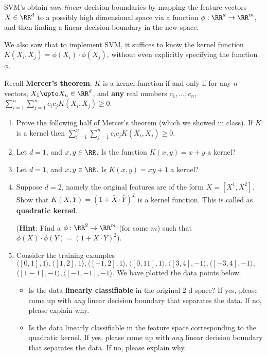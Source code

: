 \documentclass[11pt]{article}
\newenvironment{problem}[2][Problem]{\begin{trivlist}
\item[\hskip \labelsep {\bfseries #1}\hskip \labelsep {\bfseries #2.}]}{\end{trivlist}}
\begin{document}
\begin{problem}{1. (15 points)}
SVM's obtain \emph{non-linear} decision boundaries by mapping the feature vectors $ X\in \RR^d$ to a possibly high dimensional space via a function $\phi:\RR^d\to\RR^m$, and then finding a linear decision boundary in the new space. 

We also saw that to implement SVM, it suffices to know the kernel function $K( X_i,  X_j)=\phi( X_i)\cdot \phi( X_j)$, without even explicitly specifying the function $\phi$. 

Recall \textbf{Mercer's theorem}. $K$ is a kernel function if and only if for any $n$ vectors, $ X_1\upto  X_n\in \RR^d$, and \textbf{any} real numbers $c_1, \ldots, c_n$, $\sum_{i=1}^n\sum_{j=1}^n c_i c_j K( X_i,  X_j)\ge0$. 

\begin{enumerate}
\item 
Prove the following half of Mercer's theorem (which we showed in class). If $K$ is a kernel then $\sum_{i=1}^n\sum_{j=1}^n c_i c_j K( X_i, X_j)\ge0$. 
\item
Let $d=1$, and $x,y\in \RR$. Is the function $K(x,y)=x+y$ a kernel? 
\item 
Let $d=1$, and $x,y\in\RR$. Is $K(x,y)=xy+1$ a kernel?
\item
Suppose $d=2$, namely the original features are of the form $ X = [ X^1,  X^2]$. Show that $K( X, Y)=(1+\bar X\cdot \bar Y)^2$ is a kernel function. This is called as \textbf{quadratic kernel}.
 
(\textbf{Hint}: Find a $\phi:\RR^2\to \RR^m$ (for some $m$) such that $\phi( X)\cdot \phi( Y) = (1+ X\cdot Y)^2$). 
\item
Consider the training examples $\langle[0, 1], 1\rangle, \langle[1, 2], 1\rangle,\langle[-1, 2], 1\rangle,\langle[0, 11], 1\rangle, \langle[3, 4], -1\rangle, \langle[-3, 4], -1\rangle,$ $ \langle[1 -1], -1\rangle, \langle[-1, -1], -1\rangle$. We have plotted the data points below.
\begin{itemize}
\item
Is the data \textbf{linearly classifiable} in the original 2-d space? 
If yes, please come up with \emph{any} linear decision boundary that separates the data.
If no, please explain why.
\item 
Is the data linearly classifiable in the feature space corresponding to the quadratic kernel. 
If yes, please come up with \emph{any} linear decision boundary that separates the data.
If no, please explain why.
\end{itemize}
\end{enumerate}


\end{problem}
\end{document}
